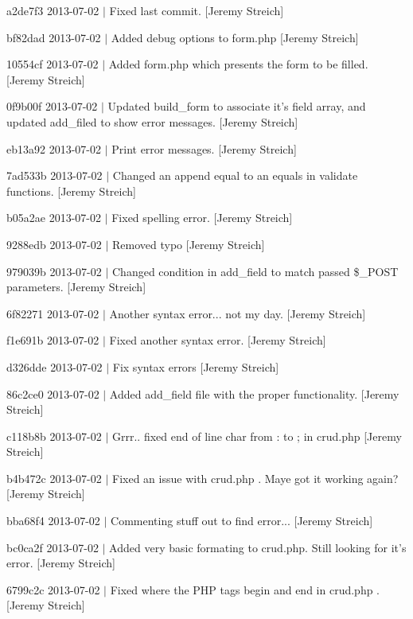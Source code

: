 \begin{DoxyItemize}
\item a2de7f3 2013-\/07-\/02 $|$ Fixed last commit. \mbox{[}Jeremy Streich\mbox{]}
\item bf82dad 2013-\/07-\/02 $|$ Added debug options to form.\-php \mbox{[}Jeremy Streich\mbox{]}
\item 10554cf 2013-\/07-\/02 $|$ Added form.\-php which presents the form to be filled. \mbox{[}Jeremy Streich\mbox{]}
\item 0f9b00f 2013-\/07-\/02 $|$ Updated build\-\_\-form to associate it's field array, and updated add\-\_\-filed to show error messages. \mbox{[}Jeremy Streich\mbox{]}
\item eb13a92 2013-\/07-\/02 $|$ Print error messages. \mbox{[}Jeremy Streich\mbox{]}
\item 7ad533b 2013-\/07-\/02 $|$ Changed an append equal to an equals in validate functions. \mbox{[}Jeremy Streich\mbox{]}
\item b05a2ae 2013-\/07-\/02 $|$ Fixed spelling error. \mbox{[}Jeremy Streich\mbox{]}
\item 9288edb 2013-\/07-\/02 $|$ Removed typo \mbox{[}Jeremy Streich\mbox{]}
\item 979039b 2013-\/07-\/02 $|$ Changed condition in add\-\_\-field to match passed \$\-\_\-\-P\-O\-S\-T parameters. \mbox{[}Jeremy Streich\mbox{]}
\item 6f82271 2013-\/07-\/02 $|$ Another syntax error... not my day. \mbox{[}Jeremy Streich\mbox{]}
\item f1e691b 2013-\/07-\/02 $|$ Fixed another syntax error. \mbox{[}Jeremy Streich\mbox{]}
\item d326dde 2013-\/07-\/02 $|$ Fix syntax errors \mbox{[}Jeremy Streich\mbox{]}
\item 86c2ce0 2013-\/07-\/02 $|$ Added add\-\_\-field file with the proper functionality. \mbox{[}Jeremy Streich\mbox{]}
\item c118b8b 2013-\/07-\/02 $|$ Grrr.. fixed end of line char from \-: to ; in crud.\-php \mbox{[}Jeremy Streich\mbox{]}
\item b4b472c 2013-\/07-\/02 $|$ Fixed an issue with crud.\-php . Maye got it working again? \mbox{[}Jeremy Streich\mbox{]}
\item bba68f4 2013-\/07-\/02 $|$ Commenting stuff out to find error... \mbox{[}Jeremy Streich\mbox{]}
\item bc0ca2f 2013-\/07-\/02 $|$ Added very basic formating to crud.\-php. Still looking for it's error. \mbox{[}Jeremy Streich\mbox{]}
\item 6799c2c 2013-\/07-\/02 $|$ Fixed where the P\-H\-P tags begin and end in crud.\-php . \mbox{[}Jeremy Streich\mbox{]}

\end{DoxyItemize}
